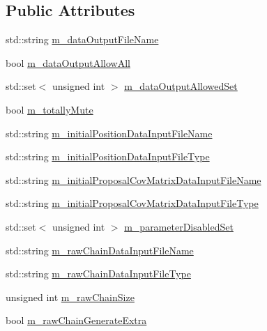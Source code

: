 \subsection*{Public Attributes}
\begin{DoxyCompactItemize}
\item 
std\-::string \hyperlink{class_q_u_e_s_o_1_1_mh_options_values_a768664ee23ad3783751eca33eaeb14b9}{m\-\_\-data\-Output\-File\-Name}
\item 
bool \hyperlink{class_q_u_e_s_o_1_1_mh_options_values_a618cab38b10aab9a1c868a2d8672f374}{m\-\_\-data\-Output\-Allow\-All}
\item 
std\-::set$<$ unsigned int $>$ \hyperlink{class_q_u_e_s_o_1_1_mh_options_values_ac3c9acb7a09d53c2ae4bd9088e99aa27}{m\-\_\-data\-Output\-Allowed\-Set}
\item 
bool \hyperlink{class_q_u_e_s_o_1_1_mh_options_values_af812309e81191e88dfdc87c5815141a3}{m\-\_\-totally\-Mute}
\item 
std\-::string \hyperlink{class_q_u_e_s_o_1_1_mh_options_values_a208c0eb1f88ee743b2710afb503c4b4d}{m\-\_\-initial\-Position\-Data\-Input\-File\-Name}
\item 
std\-::string \hyperlink{class_q_u_e_s_o_1_1_mh_options_values_ad5bdf1c0416c71aeef586e4c86b4d4be}{m\-\_\-initial\-Position\-Data\-Input\-File\-Type}
\item 
std\-::string \hyperlink{class_q_u_e_s_o_1_1_mh_options_values_af4cc4b8f1cea9441c9243d3ada49796b}{m\-\_\-initial\-Proposal\-Cov\-Matrix\-Data\-Input\-File\-Name}
\item 
std\-::string \hyperlink{class_q_u_e_s_o_1_1_mh_options_values_afd25d3ec572922fe1cf7ff39d431633e}{m\-\_\-initial\-Proposal\-Cov\-Matrix\-Data\-Input\-File\-Type}
\item 
std\-::set$<$ unsigned int $>$ \hyperlink{class_q_u_e_s_o_1_1_mh_options_values_a88f45c280bb77a8a48d47504b8d9e898}{m\-\_\-parameter\-Disabled\-Set}
\item 
std\-::string \hyperlink{class_q_u_e_s_o_1_1_mh_options_values_a3d031c2cdc8f17c589e999d11782c8ba}{m\-\_\-raw\-Chain\-Data\-Input\-File\-Name}
\item 
std\-::string \hyperlink{class_q_u_e_s_o_1_1_mh_options_values_a61974cb51a10d03dcd317dcd10f2684f}{m\-\_\-raw\-Chain\-Data\-Input\-File\-Type}
\item 
unsigned int \hyperlink{class_q_u_e_s_o_1_1_mh_options_values_a18dcb5898ba7101ae11856e866742aaf}{m\-\_\-raw\-Chain\-Size}
\item 
bool \hyperlink{class_q_u_e_s_o_1_1_mh_options_values_a9d540978290d39df801e32f183450859}{m\-\_\-raw\-Chain\-Generate\-Extra}

\end{DoxyCompactItemize}
